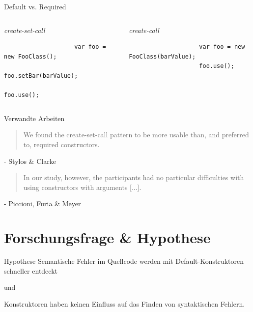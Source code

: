 \documentclass[10pt]{beamer}
\begin{document}
	\begin{frame}[fragile]{Default vs. Required}
		\begin{columns}[T,onlytextwidth]
			
			\begin{column}{0.45\textwidth}
				\begin{center}\textit{create-set-call}\end{center}
				\begin{verbatim}
					var foo = new FooClass();
					foo.setBar(barValue);
					foo.use();
				\end{verbatim}
			\end{column}
			\vrule{}
			\begin{column}{0.02\textwidth}
			\end{column}
			\begin{column}{0.53\textwidth}
				\begin{center}\textit{create-call}\end{center}
				\begin{verbatim}
					var foo = new FooClass(barValue);
					foo.use();
				\end{verbatim}
			\end{column}
			
		\end{columns}
	\end{frame}

	\begin{frame}{Verwandte Arbeiten}
		\begin{quote}
			We found the create-set-call pattern to be more
			usable than, and preferred to, required constructors.
		\end{quote}
		\hfill - Stylos \& Clarke\\
		\vspace{\baselineskip}
		\vspace{\baselineskip}
		\begin{quote}
			In our study, however, the participants had no particular
			difficulties with using constructors with arguments [...]. 
		\end{quote}
		\hfill - Piccioni, Furia \& Meyer
	
	
	\end{frame}

\section{Forschungsfrage \& Hypothese}

	\begin{frame}[standout]{Hypothese}
		Semantische Fehler im Quellcode werden mit Default-Konstruktoren schneller entdeckt
		\begin{center}\small{und}\end{center}
		Konstruktoren haben keinen Einfluss auf das Finden von syntaktischen Fehlern.
	\end{frame}
\end{document}
